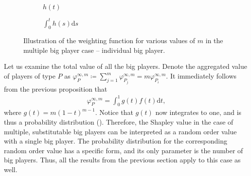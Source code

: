 \documentclass[a4paper]{article}
\newcommand{\dt}{\mathrm{d}t}
\newcommand{\ds}{\mathrm{d}s}
\begin{document}
\begin{figure}[ht]
    \centering
    \begin{subfigure}[b]{0.45\textwidth}
        \centering
        \caption{$h(t)$}
    \end{subfigure}
    \begin{subfigure}[b]{0.45\textwidth}
        \centering
        \caption{$\int_0^t h(s) \ds$}
    \end{subfigure}
    \caption{Illustration of the weighting function for various values of $m$ in the multiple big player case -- individual big player.}
    \label{fig:multiple_platforms}
\end{figure}

Let us examine the total value of all the big players.
Denote the aggregated value of players of type $P$ as $\varphi_{P}^{\infty, m} \coloneqq \sum_{j=1}^m\varphi_{P_j}^{\infty, m} = m\varphi_{P_i}^{\infty, m}$.
It immediately follows from the previous proposition that
\begin{align*}
    \varphi_{P}^{\infty, m} = \int_0^1 g(t) f(t) \dt,
\end{align*}
where $g(t) = m (1-t) ^ {m-1}$.
Notice that $g(t)$ now integrates to one, and is thus a probability distribution ().
Therefore, the Shapley value in the case of multiple, substitutable big players can be interpreted as a random order value with a single big player.
The probability distribution for the corresponding random order value has a specific form, and its only parameter is the number of big players.
Thus, all the results from the previous section apply to this case as well.
\end{document}

